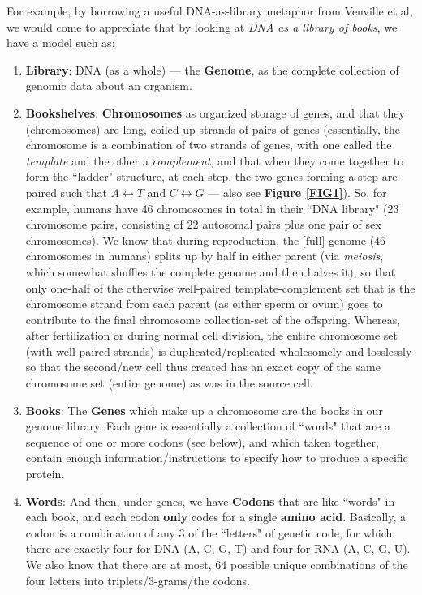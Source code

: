 \documentclass[a4paper, 18pt]{book} %
\begin{document}
For example, by borrowing a useful DNA-as-library metaphor from Venville et al\cite{venville2006analogies}, we would come to appreciate that by looking at \textit{DNA as a library of books}, we have a model such as:

\begin{enumerate}
\item \textbf{Library}: DNA (as a whole) --- the \textbf{Genome},	 as the complete collection of genomic data about an organism.
\item \textbf{Bookshelves}: \textbf{Chromosomes} as organized storage of genes, and that they (chromosomes) are long, coiled-up strands of pairs of genes (essentially, the chromosome is a combination of two strands of genes, with one called the \textit{template} and the other a \textit{complement}, and that when they come together to form the ``ladder" structure, at each step, the two genes forming a step are paired such that $A \leftrightarrow T$ and $C \leftrightarrow G$ \cite{passel_dna_structure} --- also see \textbf{Figure \ref{FIG1}}). So, for example, humans have 46 chromosomes in total in their ``DNA library" (23 chromosome pairs, consisting of 22 autosomal pairs plus one pair of sex chromosomes). We know that during reproduction, the [full] genome (46 chromosomes in humans) splits up by half in either parent (via \textit{meiosis}, which somewhat shuffles the complete genome and then halves it\cite{genomics2025origin}), so that only one-half of the otherwise well-paired template-complement set that is the chromosome strand from each parent (as either sperm or ovum) goes to contribute to the final chromosome collection-set of the offspring\cite{libretexts2025gametogenesis}\cite{gregory1987oxford}. Whereas, after fertilization or during normal cell division, the entire chromosome set (with well-paired strands) is duplicated/replicated wholesomely and losslessly so that the second/new cell thus created has an exact copy of the same chromosome set (entire genome) as was in the source cell\cite{leicester_cellcycle}. 
\item \textbf{Books}: The \textbf{Genes} which make up a chromosome are the books in our genome library. Each gene is essentially a collection of ``words" that are a sequence of one or more codons (see below), and which taken together, contain enough information/instructions to specify how to produce a specific protein\cite{gregory1987oxford}\cite{venville2006analogies}.
\item \textbf{Words}: And then, under genes, we have \textbf{Codons} that are like ``words" in each book, and each codon \textbf{only} codes for a single \textbf{amino acid}. Basically, a codon is a combination of any 3 of the ``letters" of genetic code, for which, there are exactly four for DNA (A, C, G, T) and four for RNA (A, C, G, U). We also know that there are at most, 64 possible unique combinations of the four letters into triplets/3-grams/the codons\cite{gregory1987oxford}.

\end{enumerate}
\end{document}
